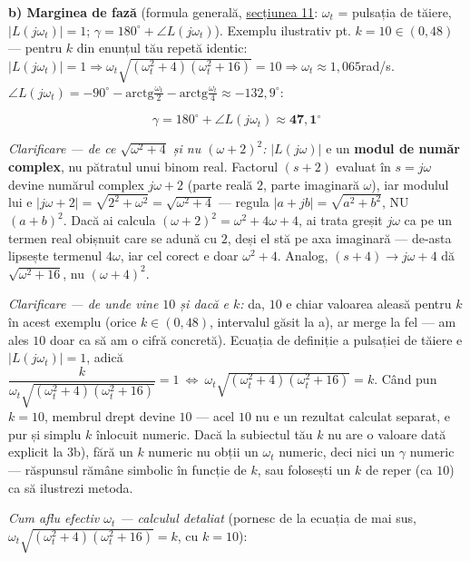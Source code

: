\documentclass[10pt,a4paper]{article}
\newcommand{\tip}[1]{\textcolor{blue!55!black}{#1}}
\begin{document}
\textbf{b) Marginea de fază} (formula generală, \hyperref[sec:11]{secțiunea 11}: $\omega_t$ = pulsația de tăiere, $|L(j\omega_t)|{=}1$; $\gamma{=}180^\circ{+}\angle L(j\omega_t)$). Exemplu ilustrativ pt. $k{=}10\in(0,48)$ — pentru $k$ din enunțul tău repetă identic: $|L(j\omega_t)|{=}1\Rightarrow\omega_t\sqrt{(\omega_t^2{+}4)(\omega_t^2{+}16)}{=}10\Rightarrow\omega_t\approx1{,}065$rad/s. $\angle L(j\omega_t){=}{-}90^\circ{-}\mathrm{arctg}\tfrac{\omega_t}2{-}\mathrm{arctg}\tfrac{\omega_t}4\approx-132{,}9^\circ$:
\begin{keyeq}\color{red!65!black}
$$\gamma=180^\circ+\angle L(j\omega_t)\approx\mathbf{47{,}1^\circ}$$
\end{keyeq}

\tip{\textit{Clarificare — de ce $\sqrt{\omega^2{+}4}$ și nu $(\omega{+}2)^2$:} $|L(j\omega)|$ e un \textbf{modul de număr complex}, nu pătratul unui binom real. Factorul $(s{+}2)$ evaluat în $s{=}j\omega$ devine numărul complex $j\omega{+}2$ (parte reală $2$, parte imaginară $\omega$), iar modulul lui e $|j\omega{+}2|{=}\sqrt{2^2{+}\omega^2}{=}\sqrt{\omega^2{+}4}$ — regula $|a{+}jb|{=}\sqrt{a^2{+}b^2}$, NU $(a{+}b)^2$. Dacă ai calcula $(\omega{+}2)^2{=}\omega^2{+}4\omega{+}4$, ai trata greșit $j\omega$ ca pe un termen real obișnuit care se adună cu $2$, deși el stă pe axa imaginară — de-asta lipsește termenul $4\omega$, iar cel corect e doar $\omega^2{+}4$. Analog, $(s{+}4)\to j\omega{+}4$ dă $\sqrt{\omega^2{+}16}$, nu $(\omega{+}4)^2$.}

\tip{\textit{Clarificare — de unde vine $10$ și dacă e $k$:} da, $10$ e chiar valoarea aleasă pentru $k$ în acest exemplu (orice $k\in(0,48)$, intervalul găsit la a), ar merge la fel — am ales $10$ doar ca să am o cifră concretă). Ecuația de definiție a pulsației de tăiere e $|L(j\omega_t)|{=}1$, adică $\dfrac{k}{\omega_t\sqrt{(\omega_t^2{+}4)(\omega_t^2{+}16)}}{=}1\ \Leftrightarrow\ \omega_t\sqrt{(\omega_t^2{+}4)(\omega_t^2{+}16)}{=}k$. Când pun $k{=}10$, membrul drept devine $10$ — acel $10$ nu e un rezultat calculat separat, e pur și simplu $k$ înlocuit numeric. Dacă la subiectul tău $k$ nu are o valoare dată explicit la 3b), fără un $k$ numeric nu obții un $\omega_t$ numeric, deci nici un $\gamma$ numeric — răspunsul rămâne simbolic în funcție de $k$, sau folosești un $k$ de reper (ca $10$) ca să ilustrezi metoda.}

\textit{Cum aflu efectiv $\omega_t$ — calculul detaliat} (pornesc de la ecuația de mai sus, $\omega_t\sqrt{(\omega_t^2{+}4)(\omega_t^2{+}16)}{=}k$, cu $k{=}10$):
\end{document}
